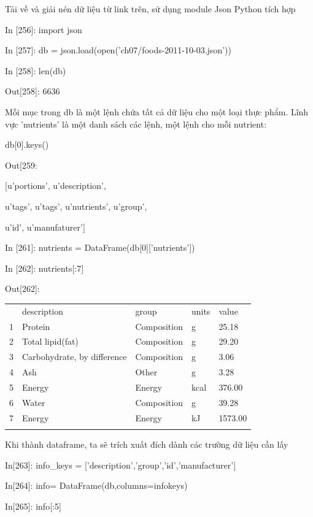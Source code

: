 \par\textup{Tải về và giải nén dữ liệu từ link trên, sử dụng module Json Python tích hợp}
\par\quad\textup{}{In [256]: import json}
\par\quad\textup{In [257]: db = json.load(open('ch07/foods-2011-10-03.json'))}
\par\quad\textup{In [258]: len(db)}
\par\quad\textup{Out[258]: 6636}
\par\textup{Mỗi mục trong db là một lệnh chứa tất cả dữ liệu cho một loại thực phẩm. Lĩnh vực 'nutrients'
là một danh sách các lệnh, một lệnh cho mỗi nutrient:}
\par\quad\textup{db[0].keys()}
\par\quad\textup{Out[259:} 
\par\quad\textup{[u'portions', u'description',}
\par\quad\textup{u'tags',  u'tags', u'nutrients', u'group',}
\par\quad\textup{ u'id', u'manufaturer']}
\par\quad\textup{In [261]: nutrients = DataFrame(db[0]['nutrients'])}
\par\quad\textup{In [262]: nutrients[:7]}
\par\quad\textup{Out[262]:}
\par\quad\begin{tabular}{lllll}
 &description & group & units & value\\
1&Protein &Composition& g &25.18\\
2&Total lipid(fat) & Composition &g & 29.20\\
3&Carbohydrate, by difference &Composition &g &3.06\\
4&Ash& Other & g & 3.28\\
5&Energy &Energy & kcal &376.00\\
6&Water & Composition & g & 39.28\\
7&Energy & Energy & kJ & 1573.00\\
\par\end{tabular}
\par\textup{Khi thành dataframe, ta sẽ trích xuất đích dành các trường dữ liệu cần lấy}
\par\quad\textup{In[263]: info\_keys = ['description','group','id','manufacturer']}
\par\quad\textup{In[264]: info= DataFrame(db,columns=info\textunderscore keys)}
\par\quad\textup {In[265]: info[:5]}
